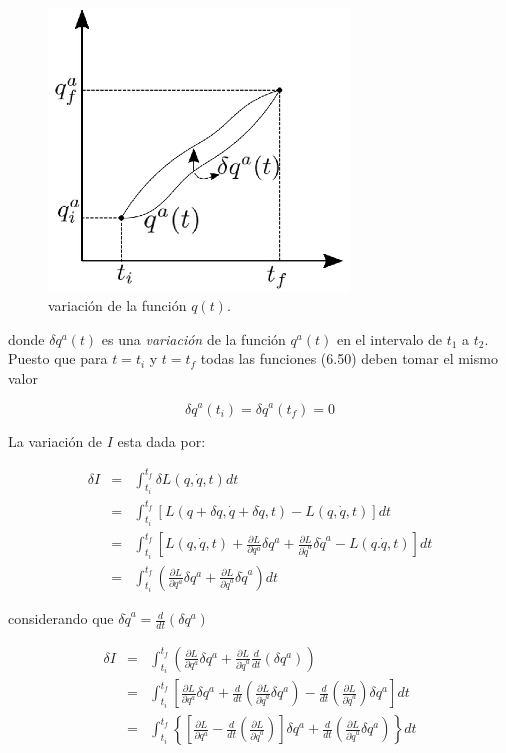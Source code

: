 \documentclass[12pt]{report}
\begin{document}
 \begin{figure}[H]
	\centering
	\includegraphics[width=8cm]{figura123.png}
	\caption{variación de la función $q(t)$.}
	\label{fig.1}
\end{figure}


donde $\delta q^a(t)$ es una \textit{variación} de la función $q^a(t)$ en el intervalo de $t_1$ a $t_2$. Puesto que para $t=t_i$ y $t=t_f$ todas las funciones (6.50) deben tomar el mismo valor 

\begin{equation}
\displaystyle \delta q^a(t_i)=\delta q^a(t_f)=0
\end{equation}

La variación de $I$ esta dada por:

\begin{eqnarray}
\delta I&=&\int_{t_i}^{t_f} \delta L \left( q,\dot{q},t \right) dt \\
&=& \int_{t_i}^{t_f} \left[ L \left( q + \delta q,\dot{q} + \delta \dot{q},t \right) - L \left( q,\dot{q},t \right) \right] dt \\
&=& \int_{t_i}^{t_f} \left[ L(q,\dot{q},t) + \frac{\partial L}{\partial q^a} \delta q^a + \frac{\partial L}{\partial \dot{q}^a} \delta \dot{q}^a - L(q.\dot{q},t) \right]dt \\
&=& \int_{t_i}^{t_f}  \left(\frac{\partial L}{\partial q^a} \delta q^a + \frac{\partial L}{\partial \dot{q}^a} \delta \dot{q}^a \right) dt 
\end{eqnarray}

considerando que $\delta \dot{q}^a = \displaystyle \frac{d}{dt} (\delta q^a)$

\begin{eqnarray}
\delta I &=& \int_{t_i}^{t_f} \left(\frac{\partial L}{\partial q^a} \delta q^a + \frac{\partial L}{\partial \dot{q}^a} \frac{d}{dt} (\delta q^a) \right) \\
&=& \int_{t_i}^{t_f} \left[ \frac{\partial L}{\partial q^a} \delta q^a + \frac{d}{dt} \left( \frac{\partial L}{\partial \dot{q}^a} \delta q^a \right)- \frac{d}{dt} \left( \frac{\partial L}{\partial \dot{q}^a} \right) \delta q^a   \right]dt \\
&=& \int_{t_i}^{t_f} \left\{ \left[  \frac{\partial L}{\partial q^a} - \frac{d}{dt} \left( \frac{\partial L}{\partial \dot{q}^a} \right) \right] \delta q^a + \frac{d}{dt} \left( \frac{\partial L}{\partial \dot{q}^a} \delta q^a \right) \right\} dt
\end{eqnarray}
\end{document}
